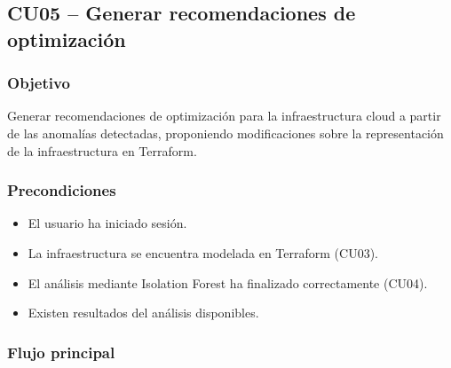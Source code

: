 \subsection{CU05 -- Generar recomendaciones de optimización}

\subsubsection*{Objetivo}

Generar recomendaciones de optimización para la infraestructura cloud a partir de las anomalías detectadas, proponiendo modificaciones sobre la representación de la infraestructura en Terraform.

\subsubsection*{Precondiciones}

\begin{itemize}
\item El usuario ha iniciado sesión.
\item La infraestructura se encuentra modelada en Terraform (CU03).
\item El análisis mediante Isolation Forest ha finalizado correctamente (CU04).
\item Existen resultados del análisis disponibles.
\end{itemize}

\subsubsection*{Flujo principal}

